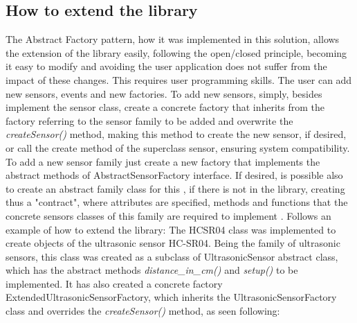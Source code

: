 \documentclass{acm_proc_article-sp}
\begin{document}
\subsection{How to extend the library}
The Abstract Factory pattern, how it was implemented in this solution, allows the extension of the library easily, following the  open/closed principle, becoming it easy to modify and avoiding the user application does not suffer from the impact of these changes. This requires user programming skills. The user can add new sensors, events and new factories. To add new sensors, simply, besides implement the sensor class, create a concrete factory that inherits from the factory referring to the sensor family to be added and overwrite the \textit{createSensor()} method, making this method to create the new sensor, if desired, or call the create method of the superclass sensor, ensuring system compatibility.
\newline
\newline
To add a new sensor family just create a new factory that implements the abstract methods of AbstractSensorFactory interface. If desired, is possible also to create an abstract family class for this , if there is not in the library, creating thus a "contract", where attributes are specified, methods and functions that the concrete sensors classes of this family are required to implement .
\newline
\newline
Follows an example of how to extend the library: The HCSR04 class was implemented to create objects of the ultrasonic sensor HC-SR04. Being the family of ultrasonic sensors, this class was created as a subclass of UltrasonicSensor abstract class, which has the abstract methods \textit{distance\_in\_cm()} and \textit{setup()}  to be implemented. It has also created a concrete factory ExtendedUltrasonicSensorFactory, which inherits the UltrasonicSensorFactory class and overrides the \textit{createSensor()} method, as seen following:
\end{document}
